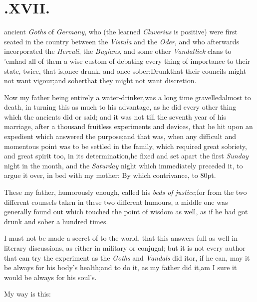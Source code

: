 \documentclass{article}
\begin{document}
\smallskip

\section{.\enspace XVII.}

 ancient \textit{Goths} of
\textit{Germany}, who (the learned \textit{Cluverius} is positive) were
first seated in the country between the \textit{Vistula} and the
\textit{Oder}, and who afterwards incorporated the \textit{Herculi}, the
\textit{Bugians}, and some other \textit{Vandallick} clans to
’em\tsk had all of them a wise custom of debating every
thing of importance to their state, twice, that is,\tsk once
drunk, and once sober:\tsh Drunk\tsk that their councils
might not want vigour;\tsh and sober\tsk that they might
not want discretion.

Now my father being entirely a water-drinker,\tsk was a long
time gravelled\break almost to death, in turning this as much to his
advantage, as he did every other thing which the ancients did or
said; and it was not till the seventh year of his marriage, after a
thousand fruitless experiments and devices, that he hit upon an
expedient which answered the purpose;\tsh and that was,
when any difficult and momentous point was to be settled in the
family, which required great sobriety, and great spirit too, in its
determination,\tsh he fixed and set apart the first
\textit{Sunday} night in the month, and
the \textit{Saturday} night which immediately
preceded it, to argue it over, in bed\break
with my mother: By which contrivance,\break
{}
\stick{\astfill}
\stick{\astfill}
\stick{\astfill}
\hbox to 80pt{\astfill}.

These my father, humorously enough, called his \textit{beds of
justice};\tsh for from the two different counsels taken
in these two different humours, a middle one was generally found
out which touched the point of wisdom as well, as if he had got
drunk and sober a hundred times.

I must not be made a secret of to the world, that this answers
full as well in literary discussions, as either in military or
conjugal; but it is not every author that can try the experiment as
the \textit{Goths} and \textit{Vandals} did it\tsh or, if he
can, may it be always for his body’s health;\break and to do it, as
my father did it,\tsk\break am I sure it would be always for his
soul’s.

My way is this:\tsh
\end{document}
